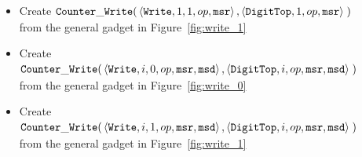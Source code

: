 \begin{itemize}
\begin{itemize}
        \item Create
        $\begin{aligned}[t]
            {\tt Counter\_Write}(& \left\langle {\tt Write},    1, 1, op, {\tt msr} \right\rangle,
                       \left\langle {\tt DigitTop}, 1,    op, {\tt msr} \right\rangle \;)
        \end{aligned}$ \\ from the general gadget in Figure~\ref{fig:write_1}

        \item Create
        $\begin{aligned}[t]
            {\tt Counter\_Write}(& \left\langle {\tt Write},    i, 0, op, {\tt msr}, {\tt msd}\right\rangle,
                       \left\langle {\tt DigitTop}, i,    op, {\tt msr}, {\tt msd}\right\rangle \;)
        \end{aligned}$ \\ from the general gadget in Figure~\ref{fig:write_0}

        \item Create
        $\begin{aligned}[t]
            {\tt Counter\_Write}(& \left\langle {\tt Write},    i, 1, op, {\tt msr}, {\tt msd}\right\rangle,
                       \left\langle {\tt DigitTop}, i,    op, {\tt msr}, {\tt msd}\right\rangle \;)
        \end{aligned}$ \\ from the general gadget in Figure~\ref{fig:write_1}
    \end{itemize}


\end{itemize}

\vspace{.5cm}

